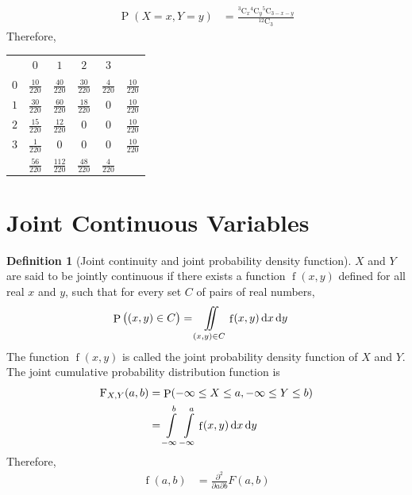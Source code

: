 \documentclass[titlepage, fleqn, a4paper, 12pt, twoside]{article}
\theoremstyle{definition}
\newtheorem{definition}{Definition}
\theoremstyle{theorem}
\DeclareMathOperator{\prob}{\mathrm{P}}
\DeclareMathOperator{\pdf}{\mathrm{f}}
\newcommand*{\comb}[2]{{}^{#1}\mathrm{C}_{#2}}%
\newcommand*{\cdf}[1]{\mathrm{F}_{#1}}
\begin{document}
\begin{solution}
	\begin{align*}
		\prob(X = x , Y = y) & = \frac{\comb{3}{x} \comb{4}{y} \comb{5}{3 - x - y}}{\comb{12}{3}}
	\end{align*}
	Therefore,
	\begin{table}[H]
		\centering
		\begin{tabular}{c c c c c c}
                            & $0$              & $1$               & $2$              & $3$             &                  \\
			$0$ & $\frac{10}{220}$ & $\frac{40}{220}$  & $\frac{30}{220}$ & $\frac{4}{220}$ & $\frac{10}{220}$ \\
			$1$ & $\frac{30}{220}$ & $\frac{60}{220}$  & $\frac{18}{220}$ & $0$             & $\frac{10}{220}$ \\
			$2$ & $\frac{15}{220}$ & $\frac{12}{220}$  & $0$              & $0$             & $\frac{10}{220}$ \\
			$3$ & $\frac{1}{220}$  & $0$               & $0$              & $0$             & $\frac{10}{220}$ \\
                            & $\frac{56}{220}$ & $\frac{112}{220}$ & $\frac{48}{220}$ & $\frac{4}{220}$ &                  \\
		\end{tabular}
	\end{table}
\end{solution}

\section{Joint Continuous Variables}

\begin{definition}[Joint continuity and joint probability density function]
	$X$ and $Y$ are said to be jointly continuous if there exists a function $\pdf(x,y)$ defined for all real $x$ and $y$, such that for every set $C$ of pairs of real numbers,
	\begin{align*}
		\prob\left( (x,y) \in C \right) & = \iint\limits_{(x,y) \in C} \pdf(x,y) \dif x \dif y
	\end{align*}
	The function $\pdf(x,y)$ is called the joint probability density function of $X$ and $Y$.\\
	The joint cumulative probability distribution function is
	\begin{align*}
		\cdf{X,Y}(a,b) & = \prob(-\infty \le X \le a , -\infty \le Y \le b) \\
                               & = \int\limits_{-\infty}^{b} \int\limits_{-\infty}^{a} \pdf(x,y) \dif x \dif y
	\end{align*}
	Therefore,
	\begin{align*}
		\pdf(a,b) & = \frac{\partial^2}{\partial a \partial b} F(a,b)
	\end{align*}
\end{definition}
\end{document}
